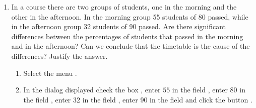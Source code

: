 \begin{enumerate}[leftmargin=*]
\item In a course there are two groups of students, one in the morning and the other in the afternoon.
In the morning group 55 students of 80 passed, while in the afternoon group 32 students of 90 passed.
Are there significant differences between the percentages of students that passed in the morning and in the afternoon?
Can we conclude that the timetable is the cause of the differences?
Justify the answer. 
\begin{indication}
\begin{enumerate}
\item Select the menu .
\item In the dialog displayed check the box , enter $55$ in the field , enter 80 in the field , enter 32 in the field , enter 90 in
the field  and click the button .
\end{enumerate}
\end{indication}
\end{enumerate}


